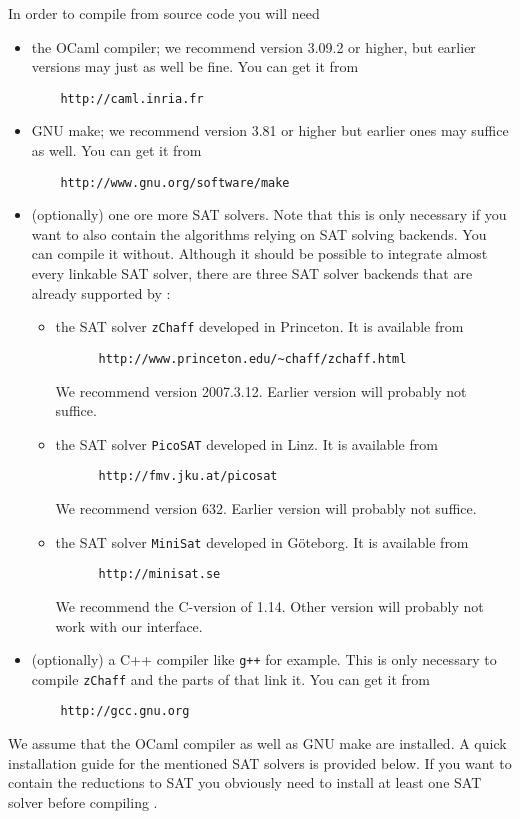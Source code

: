 In order to compile \pgsolver from source code you will need
\begin{itemize}
\item the OCaml compiler; we recommend version 3.09.2 or higher, but earlier versions
      may just as well be fine. You can get it from
      \begin{verbatim}
    http://caml.inria.fr\end{verbatim}
\item GNU make; we recommend version 3.81 or higher but earlier ones may suffice as well.
      You can get it from
      \begin{verbatim}
    http://www.gnu.org/software/make\end{verbatim}
\item (optionally) one ore more SAT solvers. Note that this is only necessary if you want
      \pgsolver to also contain the algorithms relying on SAT solving backends. You can
      compile it without. Although it should be possible to integrate almost every linkable
      SAT solver, there are three SAT solver backends that are already supported by
      \pgsolver:

	\begin{itemize}
		\item the SAT solver \texttt{zChaff} developed in Princeton. It is available from
        \begin{verbatim}
      http://www.princeton.edu/~chaff/zchaff.html\end{verbatim}
        We recommend version 2007.3.12. Earlier version will probably not suffice.

        \item the SAT solver \texttt{PicoSAT} developed in Linz. It is available from
        \begin{verbatim}
      http://fmv.jku.at/picosat\end{verbatim}
        We recommend version 632. Earlier version will probably not suffice.

        \item the SAT solver \texttt{MiniSat} developed in G\"oteborg. It is available from
        \begin{verbatim}
      http://minisat.se\end{verbatim}
        We recommend the C-version of 1.14. Other version will probably not work with our interface.
    \end{itemize}

\item (optionally) a C++ compiler like \texttt{g++} for example. This is only necessary
      to compile \texttt{zChaff} and the parts of \pgsolver that link it. You can get it
      from
      \begin{verbatim}
    http://gcc.gnu.org\end{verbatim}
\end{itemize}
We assume that the OCaml compiler as well as GNU make are installed. A quick installation
guide for the mentioned SAT solvers is provided below. If you want \pgsolver to contain the
reductions to SAT you obviously need to install at least one SAT solver before compiling \pgsolver.


